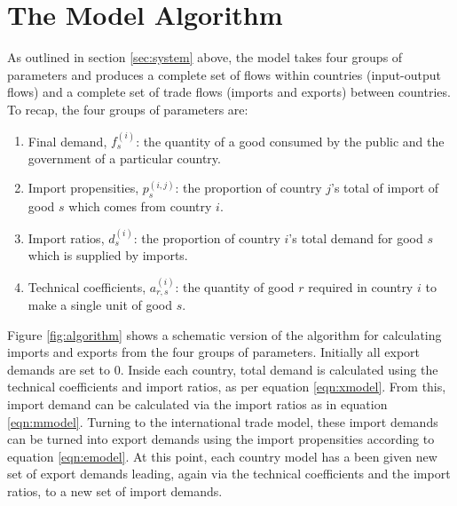 \documentclass[a4paper]{article}
\begin{document}
\section{The Model Algorithm}\label{sec:algorithm}
As outlined in section \ref{sec:system} above, the model takes four groups of parameters and produces a complete set of flows within countries (input-output flows) and a complete set of trade flows (imports and exports) between countries.
To recap, the four groups of parameters are:
\begin{enumerate}
\item Final demand, $f_s^{(i)}$: the quantity of a good consumed by the public and the government of a particular country.
\item Import propensities, $p_s^{(i,j)}$: the proportion of country $j$'s total of import of good $s$ which comes from country $i$.
\item Import ratios, $d_s^{(i)}$: the proportion of country $i$'s total demand for good $s$ which is supplied by imports.
\item Technical coefficients, $a_{r,s}^{(i)}$: the quantity of good $r$ required in country $i$ to make a single unit of good $s$.
\end{enumerate}

Figure \ref{fig:algorithm} shows a schematic version of the algorithm for calculating imports and exports from the four groups of parameters.
Initially all export demands are set to 0.
Inside each country, total demand is calculated using the technical coefficients and import ratios, as per equation \eqref{eqn:xmodel}.
From this, import demand can be calculated via the import ratios as in equation \eqref{eqn:mmodel}.
Turning to the international trade model, these import demands can be turned into export demands using the import propensities according to equation \eqref{eqn:emodel}.
At this point, each country model has a been given new set of export demands leading, again via the technical coefficients and the import ratios, to a new set of import demands.
\end{document}

